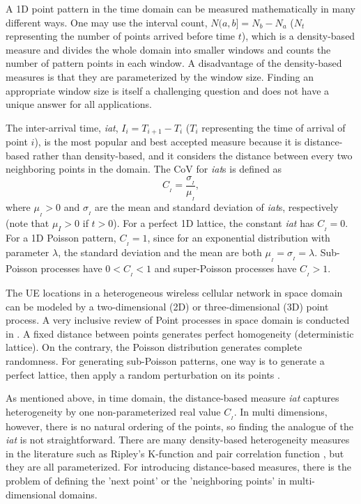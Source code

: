 \documentclass[journal]{IEEEtran}
\begin{document}
A 1D point pattern in the time domain can be measured mathematically in many different ways. One may use the interval count, $N(a, b] = N_{b} - N_{a}$ ($N_{t}$ representing the number of points arrived before time $t$), which is a density-based measure and divides the whole domain into smaller windows and counts the number of pattern points in each window. A disadvantage of the density-based measures is that they are parameterized by the window size. Finding an appropriate window size is itself a challenging question and does not have a unique answer for all applications.

The inter-arrival time, \textit{iat}, $I_{i} = T_{i+1} - T_{i}$ ($T_{i}$ representing the time of arrival of point $i$), is the most popular and best accepted measure because it is distance-based rather than density-based, and it considers the distance between every two neighboring points in the domain. The CoV for \textit{iat}s is defined as
\begin{equation}
C_{_{I}} = \frac{\sigma_{_{I}}}{\mu_{_{I}}},
\end{equation}
where $\mu_{_{I}} > 0$ and $\sigma_{_{I}}$ are the mean and standard deviation of \textit{iat}s, respectively (note that $\mu_I > 0$ if $t > 0$). For a perfect 1D lattice, the constant \textit{iat} has $C_{_{I}} = 0$. For a 1D Poisson pattern, $C_{_{I}}=1$, since for an exponential distribution with parameter $\lambda$, the standard deviation and the mean are both $\mu_{_{I}} = \sigma_{_{I}} = \lambda$. Sub-Poisson processes have $0 < C_{_{I}} < 1$ and super-Poisson processes have $C_{_{I}} > 1$.

The UE locations in a heterogeneous wireless cellular network in space domain can be modeled by a two-dimensional (2D) or three-dimensional (3D) point process. A very inclusive review of Point processes in space domain is conducted in \cite{blaszczyszyn2012clustering}. A fixed distance between points generates perfect homogeneity (deterministic lattice). On the contrary, the Poisson distribution generates complete randomness. For generating sub-Poisson patterns, one way is to generate a perfect lattice, then apply a random perturbation on its points \cite{rataj1993convergence,lucarini2008symmetry,blaszczyszyn2012clustering}.

As mentioned above, in time domain, the distance-based measure \textit{iat} captures heterogeneity by one non-parameterized real value $C_{_{I}}$. In multi dimensions, however, there is no natural ordering of the points, so finding the analogue of the \textit{iat} is not straightforward. There are many density-based heterogeneity measures in the literature such as Ripley's K-function and pair correlation function \cite{blaszczyszyn2012clustering}, but they are all parameterized. For introducing distance-based measures, there is the problem of defining the 'next point' or the 'neighboring points' in multi-dimensional domains.
\end{document}
